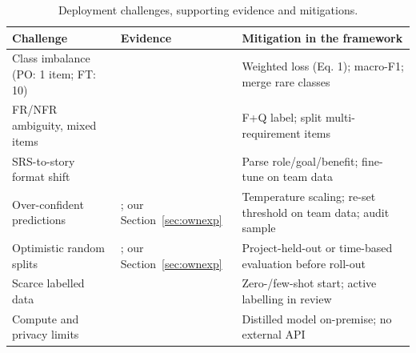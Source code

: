\documentclass[conference,10pt,letterpaper]{IEEEtran}
\begin{document}
\begin{table}[!t]
\centering
\caption{Deployment challenges, supporting evidence and mitigations.}
\label{tab:chal}
\scriptsize
\setlength{\tabcolsep}{3pt}
\renewcommand{\arraystretch}{1.12}
\begin{tabular}{>{\raggedright\arraybackslash}p{2.35cm}>{\raggedright\arraybackslash}p{2.0cm}>{\raggedright\arraybackslash}p{3.2cm}}
\toprule
\textbf{Challenge} & \textbf{Evidence} & \textbf{Mitigation in the framework} \\
\midrule
Class imbalance (PO: 1 item; FT: 10) & \cite{johnson2019} & Weighted loss (Eq. 1); macro-F1; merge rare classes \\
FR/NFR ambiguity, mixed items & \cite{dalpiaz2019,vancan2025} & F+Q label; split multi-requirement items \\
SRS-to-story format shift & \cite{lucassen2016use,vancan2025} & Parse role/goal/benefit; fine-tune on team data \\
Over-confident predictions & \cite{guo2017calibration}; our Section~\ref{sec:ownexp} & Temperature scaling; re-set threshold on team data; audit sample \\
Optimistic random splits & \cite{hey2022corrected}; our Section~\ref{sec:ownexp} & Project-held-out or time-based evaluation before roll-out \\
Scarce labelled data & \cite{alhoshan2023,tunstall2022setfit} & Zero-/few-shot start; active labelling in review \\
Compute and privacy limits & \cite{sanh2019distilbert} & Distilled model on-premise; no external API \\
\bottomrule
\end{tabular}
\end{table}
\end{document}
